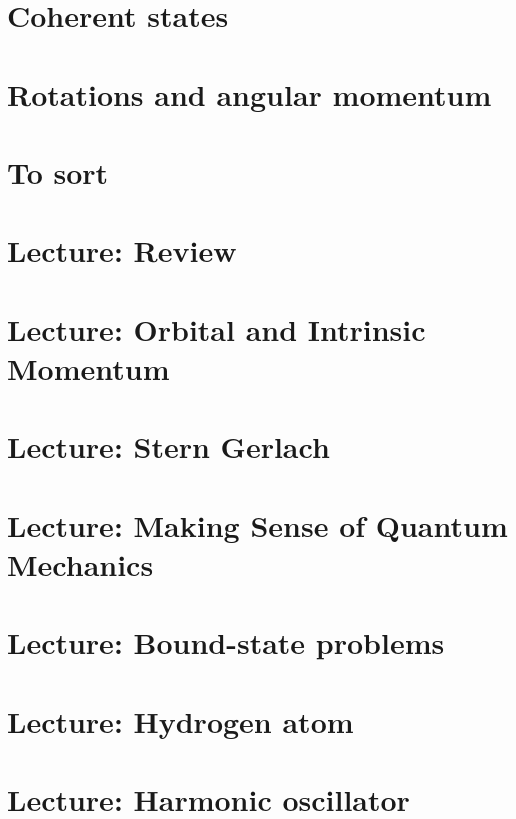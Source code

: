    \chapter{Coherent states}
      

   \chapter{Rotations and angular momentum}
      

   \chapter{To sort}
      

   \chapter{Lecture: Review}
      

   \chapter{Lecture: Orbital and Intrinsic Momentum}
      

   \chapter{Lecture: Stern Gerlach}
      

   \chapter{Lecture: Making Sense of Quantum Mechanics}
      

   \chapter{Lecture: Bound-state problems}
      

   \chapter{Lecture: Hydrogen atom}
      

   \chapter{Lecture: Harmonic oscillator}
      


